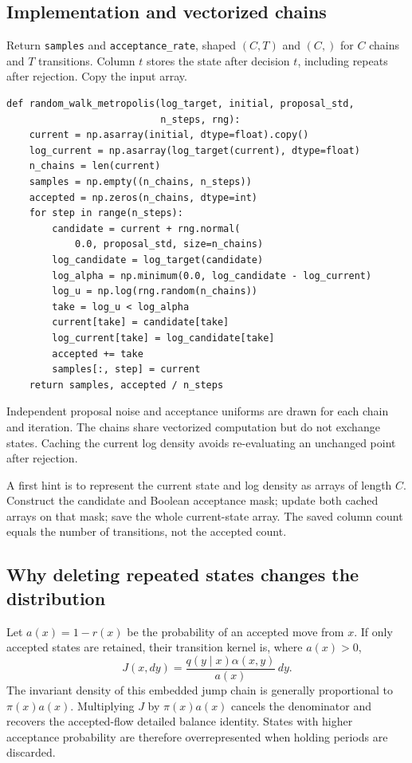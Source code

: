 \documentclass[11pt,a4paper]{article}
\begin{document}
\subsection{Implementation and vectorized chains}
Return \texttt{samples} and \texttt{acceptance\_rate}, shaped $(C,T)$ and
$(C,)$ for $C$ chains and $T$ transitions. Column $t$ stores the state after
decision $t$, including repeats after rejection. Copy the input array.
\begin{minipage}{\linewidth}
\begin{lstlisting}
def random_walk_metropolis(log_target, initial, proposal_std,
                           n_steps, rng):
    current = np.asarray(initial, dtype=float).copy()
    log_current = np.asarray(log_target(current), dtype=float)
    n_chains = len(current)
    samples = np.empty((n_chains, n_steps))
    accepted = np.zeros(n_chains, dtype=int)
    for step in range(n_steps):
        candidate = current + rng.normal(
            0.0, proposal_std, size=n_chains)
        log_candidate = log_target(candidate)
        log_alpha = np.minimum(0.0, log_candidate - log_current)
        log_u = np.log(rng.random(n_chains))
        take = log_u < log_alpha
        current[take] = candidate[take]
        log_current[take] = log_candidate[take]
        accepted += take
        samples[:, step] = current
    return samples, accepted / n_steps
\end{lstlisting}
\end{minipage}
Independent proposal noise and acceptance uniforms are drawn for each chain
and iteration. The chains share vectorized computation but do not exchange
states. Caching the current log density avoids re-evaluating an unchanged
point after rejection.

A first hint is to represent the current state and log density as arrays of
length $C$. Construct the candidate and Boolean acceptance mask; update both
cached arrays on that mask; save the whole current-state array. The saved
column count equals the number of transitions, not the accepted count.

\subsection{Why deleting repeated states changes the distribution}
Let $a(x)=1-r(x)$ be the probability of an accepted move from $x$. If only
accepted states are retained, their transition kernel is, where $a(x)>0$,
\[
 J(x,dy)=\frac{q(y\mid x)\alpha(x,y)}{a(x)}\,dy.
\]
The invariant density of this embedded jump chain is generally proportional
to $\pi(x)a(x)$. Multiplying $J$ by $\pi(x)a(x)$ cancels the denominator
and recovers the accepted-flow detailed balance identity. States with higher
acceptance probability are therefore overrepresented when holding periods
are discarded.
\end{document}
